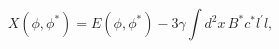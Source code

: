 \begin{equation*}
X(\phi ,\phi ^{\ast })=E(\phi ,\phi ^{\ast })-3\gamma \int d^{2}x\,B^{\ast
}c^{\ast }l^{\prime }l,
\end{equation*}

